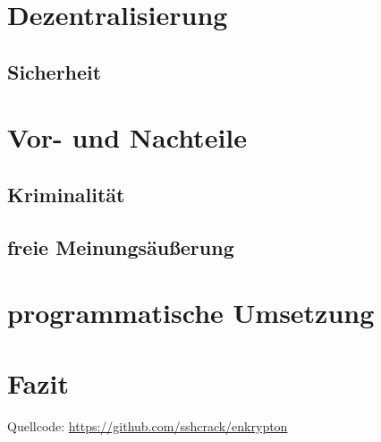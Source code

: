 \documentclass[a4paper,ngerman, headheight=28pt,12pt]{scrartcl}
\begin{document}


\section{Dezentralisierung}
\subsection{Sicherheit}


\section{Vor- und Nachteile}
\subsection{Kriminalität}
\subsection{freie Meinungsäußerung}

\section{programmatische Umsetzung}

\section{Fazit}

\pagebreak
\nolinenumbers{}
\printbibliography[notkeyword={figure}]
\printbibliography[heading=subbibliography,title={Anhang},keyword={figure}]
Quellcode: \href{https://github.com/sshcrack/enkrypton}{https://github.com/sshcrack/enkrypton}
\end{document}
